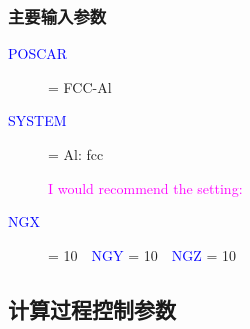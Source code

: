 \documentclass[cjk,slidestop,compress,mathserif,blue]{beamer}
\begin{document}
\frame
{
\frametitle{主要输入参数}
\begin{description}
	\item[\textcolor{blue}{POSCAR}]=  FCC-Al~~\textcolor{brown}{\fontsize{9.2pt}{3.9pt}\selectfont{\# comment line}} 
	\item[\textcolor{blue}{SYSTEM}]=  Al: fcc                                 
	\item[] \textcolor{magenta}{I would recommend the setting:}
	\item[\textcolor{blue}{NGX}] = 10~~\textcolor{blue}{NGY} = 10~~\textcolor{blue}{NGZ} = 10~~\textcolor{brown}{\fontsize{7.2pt}{3.9pt}\selectfont{dimension x,y,z}}
\end{description}
}

\subsection{计算过程控制参数}
\frame
\end{document}
